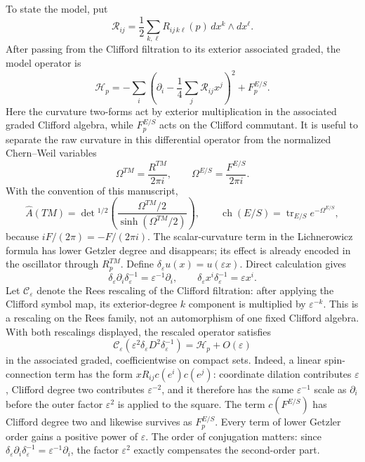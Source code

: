 \documentclass[11pt,oneside,reqno]{book}
\newcommand{\Ahat}{\widehat A}
\theoremstyle{plain}
\theoremstyle{definition}
\theoremstyle{remark}
\begin{document}
To state the model, put
\[
 \mathcal R_{ij}
 =
 \frac12\sum_{k,\ell}R_{ij\,k\ell}(p)\,
 dx^k\wedge dx^\ell.
\]
After passing from the Clifford filtration to its exterior associated
graded, the model operator is
\[
 \mathcal H_p
 =
 -\sum_i\left(
 \partial_i-\frac14\sum_j\mathcal R_{ij}x^j
 \right)^2
 +F^{E/S}_p.
\]
Here the curvature two-forms act by exterior multiplication in the
associated graded Clifford algebra, while \(F^{E/S}_p\) acts on the
Clifford commutant. It is useful to separate the raw curvature in this
differential operator from the normalized Chern--Weil variables
\begin{equation}\label{eq:Omega-normalization}
 \Omega^{TM}=\frac{R^{TM}}{2\pi i},
 \qquad
 \Omega^{E/S}=\frac{F^{E/S}}{2\pi i}.
\end{equation}
With the convention of this manuscript,
\[
 \Ahat(TM)=\det{}^{1/2}
 \left(\frac{\Omega^{TM}/2}{\sinh(\Omega^{TM}/2)}\right),
 \qquad
 \operatorname{ch}(E/S)=\operatorname{tr}_{E/S}e^{-\Omega^{E/S}},
\]
because \(iF/(2\pi)=-F/(2\pi i)\).
The scalar-curvature term in the Lichnerowicz formula has lower Getzler
degree and disappears; its effect is already encoded in the oscillator
through \(R^{TM}_p\).  Define
\(\delta_\varepsilon u(x)=u(\varepsilon x)\).  Direct calculation gives
\[
 \delta_\varepsilon\partial_i\delta_\varepsilon^{-1}
 =\varepsilon^{-1}\partial_i,
 \qquad
 \delta_\varepsilon x^i\delta_\varepsilon^{-1}
 =\varepsilon x^i.
\]
Let \(\mathcal C_\varepsilon\) denote the Rees rescaling of the Clifford
filtration: after applying the Clifford symbol map, its exterior-degree
\(k\) component is multiplied by \(\varepsilon^{-k}\).  This is a
rescaling on the Rees family, not an automorphism of one fixed Clifford
algebra.  With both rescalings displayed, the rescaled operator satisfies
\begin{equation}\label{eq:getzler-dilation}
 \mathcal C_\varepsilon\!\left(
  \varepsilon^2\delta_\varepsilon D^2
  \delta_\varepsilon^{-1}
 \right)
 =\mathcal H_p+O(\varepsilon)
\end{equation}
in the associated graded, coefficientwise on compact sets.  Indeed, a
linear spin-connection term has the form \(xR_{ij}c(e^i)c(e^j)\): coordinate
dilation contributes \(\varepsilon\), Clifford degree two contributes
\(\varepsilon^{-2}\), and it therefore has the same
\(\varepsilon^{-1}\) scale as \(\partial_i\) before the outer factor
\(\varepsilon^2\) is applied to the square.  The term
\(c(F^{E/S})\) has Clifford degree two and likewise survives as
\(F^{E/S}_p\).  Every term of lower Getzler order gains a positive power of
\(\varepsilon\).  The order of conjugation matters: since
\(\delta_\varepsilon\partial_i\delta_\varepsilon^{-1}=\varepsilon^{-1}\partial_i\),
the factor \(\varepsilon^2\) exactly compensates the second-order part.
\end{document}
